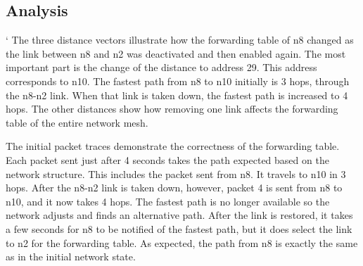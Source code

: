 \documentclass[fleqn,11pt]{article}
\begin{document}
	\subsection{Analysis}
	`
	The three distance vectors illustrate how the forwarding table of n8 changed as the link between n8 and n2 was
	deactivated and then enabled again. The most important part is the change of the distance to address 29. This
	address corresponds to n10. The fastest path from n8 to n10 initially is 3 hops, through the n8-n2 link. When that
	link is taken down, the fastest path is increased to 4 hops. The other distances show how removing one link affects
	the forwarding table of the entire network mesh.
	
	The initial packet traces demonstrate the correctness of the forwarding table. Each packet sent just after 4 seconds
	takes the path expected based on the network structure. This includes the packet sent from n8. It travels to n10 in 
	3 hops. After the n8-n2 link is taken down, however, packet 4 is sent from n8 to n10, and it now takes 4 hops. The
	fastest path is no longer available so the network adjusts and finds an alternative path. After the link is
	restored, it takes a few seconds for n8 to be notified of the fastest path, but it does select the link to n2 for
	the forwarding table. As expected, the path from n8 is exactly the same as in the initial network state.
	
	
\end{document}
